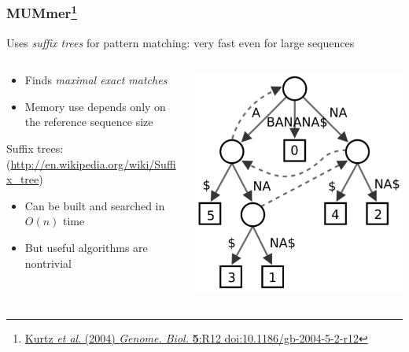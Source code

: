 \begin{frame}
  \frametitle{MUMmer\footnote{\tiny{\href{http://dx.doi.org/10.1186/gb-2004-5-2-r12}{Kurtz \textit{et al}. (2004) \textit{Genome. Biol.} \textbf{5}:R12 doi:10.1186/gb-2004-5-2-r12}}}}
  Uses \textit{suffix trees} for pattern matching: very fast even for large sequences
  \begin{columns}[T]
    \begin{column}{5cm}  
      \begin{itemize}
        \item Finds \textit{maximal exact matches}
        \item Memory use depends only on the reference sequence size
      \end{itemize}
      Suffix trees: {\tiny(\href{http://en.wikipedia.org/wiki/Suffix_tree}{http://en.wikipedia.org/wiki/Suffix\_tree})}
      \begin{itemize}
        \item Can be built and searched in $O(n)$ time
        \item But useful algorithms are nontrivial
      \end{itemize}
    \end{column}
    \begin{column}{5cm}
      \includegraphics[width=1\textwidth]{images/suffix_tree}
    \end{column}
  \end{columns}      
\end{frame}

